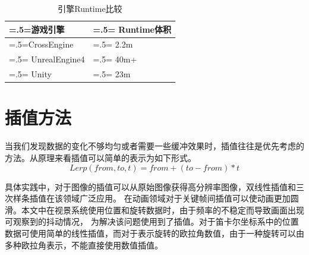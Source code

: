 \begin{table}[h!]
    \begin{center}
        \caption{引擎Runtime比较}
        \label{enginert}
        \renewcommand\arraystretch{1.5}
        \begin{tabularx}{0.8\textwidth}{ 
            | >{\centering\arraybackslash\hsize=.5\hsize\linewidth=\hsize}X 
            | >{\centering\arraybackslash\hsize=.5\hsize\linewidth=\hsize}X 
            | }
            \hline
            \textbf{游戏引擎} & \textbf{Runtime体积} \\
            \hline
            CrossEngine & 2.2m \\
            \hline
            UnrealEngine4 & 40m+\\
            \hline
            Unity & 23m\\
            \hline
        \end{tabularx}
    \end{center}
\end{table}



\section{插值方法}
当我们发现数据的变化不够均匀或者需要一些缓冲效果时，插值往往是优先考虑的方法。从原理来看插值可以简单的表示为如下形式。
$$Lerp(from,to,t)=from+(to-from)*t$$
\par
具体实践中，对于图像的插值可以从原始图像获得高分辨率图像，双线性插值和三次样条插值在该领域广泛应用\cite{lerp2}。
在动画领域对于关键帧间插值可以使动画更加圆滑。本文中在视景系统使用位置和旋转数据时，由于频率的不稳定而导致画面出现可观察到的抖动情况，
为解决该问题使用到了插值。对于笛卡尔坐标系中的位置数据可使用简单的线性插值，而对于表示旋转的欧拉角数值，由于一种旋转可以由多种欧拉角表示，不能直接使用数值插值。
